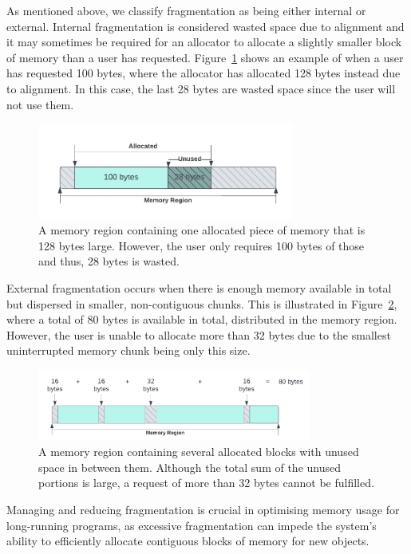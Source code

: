 
As mentioned above, we classify fragmentation as being either internal or external. Internal fragmentation is considered wasted space due to alignment and it may sometimes be required for an allocator to allocate a slightly smaller block of memory than a user has requested. Figure~\ref{fig:internal_fragmentation} shows an example of when a user has requested 100 bytes, where the allocator has allocated 128 bytes instead due to alignment. In this case, the last 28 bytes are wasted space since the user will not use them.

\begin{figure}[H]
    \centering
    \includegraphics[width=0.75\textwidth]{figures/internal_fragmentation.png}
    \caption{A memory region containing one allocated piece of memory that is 128 bytes large. However, the user only requires 100 bytes of those and thus, 28 bytes is wasted.}
    \label{fig:internal_fragmentation}
\end{figure}

External fragmentation occurs when there is enough memory available in total but dispersed in smaller, non-contiguous chunks. This is illustrated in Figure~\ref{fig:external_fragmentation}, where a total of 80 bytes is available in total, distributed in the memory region. However, the user is unable to allocate more than 32 bytes due to the smallest uninterrupted memory chunk being only this size.

\begin{figure}[H]
    \centering
    \includegraphics[width=0.8\textwidth]{figures/external_fragmentation.png}
    \caption{A memory region containing several allocated blocks with unused space in between them. Although the total sum of the unused portions is large, a request of more than 32 bytes cannot be fulfilled.}
    \label{fig:external_fragmentation}
\end{figure}

Managing and reducing fragmentation is crucial in optimising memory usage for long-running programs, as excessive fragmentation can impede the system's ability to efficiently allocate contiguous blocks of memory for new objects.

